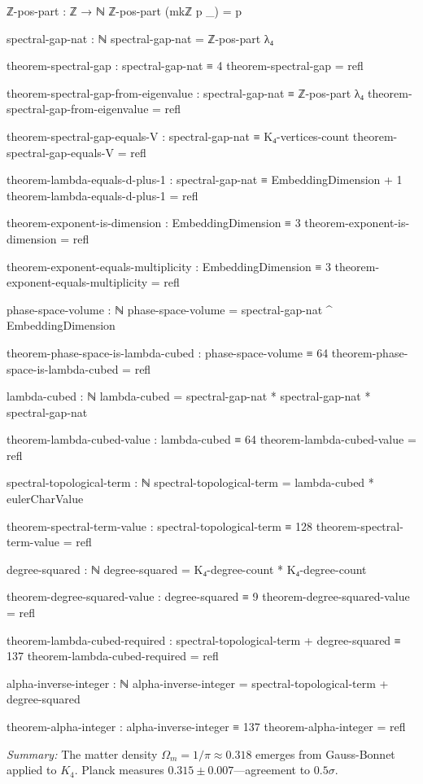 \documentclass[11pt,a4paper]{book}
\begin{document}
\begin{code}
ℤ-pos-part : ℤ → ℕ
ℤ-pos-part (mkℤ p _) = p

spectral-gap-nat : ℕ
spectral-gap-nat = ℤ-pos-part λ₄

theorem-spectral-gap : spectral-gap-nat ≡ 4
theorem-spectral-gap = refl

theorem-spectral-gap-from-eigenvalue : spectral-gap-nat ≡ ℤ-pos-part λ₄
theorem-spectral-gap-from-eigenvalue = refl

theorem-spectral-gap-equals-V : spectral-gap-nat ≡ K₄-vertices-count
theorem-spectral-gap-equals-V = refl

theorem-lambda-equals-d-plus-1 : spectral-gap-nat ≡ EmbeddingDimension + 1
theorem-lambda-equals-d-plus-1 = refl

theorem-exponent-is-dimension : EmbeddingDimension ≡ 3
theorem-exponent-is-dimension = refl

theorem-exponent-equals-multiplicity : EmbeddingDimension ≡ 3
theorem-exponent-equals-multiplicity = refl

phase-space-volume : ℕ
phase-space-volume = spectral-gap-nat ^ EmbeddingDimension

theorem-phase-space-is-lambda-cubed : phase-space-volume ≡ 64
theorem-phase-space-is-lambda-cubed = refl

lambda-cubed : ℕ
lambda-cubed = spectral-gap-nat * spectral-gap-nat * spectral-gap-nat

theorem-lambda-cubed-value : lambda-cubed ≡ 64
theorem-lambda-cubed-value = refl

spectral-topological-term : ℕ
spectral-topological-term = lambda-cubed * eulerCharValue

theorem-spectral-term-value : spectral-topological-term ≡ 128
theorem-spectral-term-value = refl

degree-squared : ℕ
degree-squared = K₄-degree-count * K₄-degree-count

theorem-degree-squared-value : degree-squared ≡ 9
theorem-degree-squared-value = refl

theorem-lambda-cubed-required : spectral-topological-term + degree-squared ≡ 137
theorem-lambda-cubed-required = refl

alpha-inverse-integer : ℕ
alpha-inverse-integer = spectral-topological-term + degree-squared

theorem-alpha-integer : alpha-inverse-integer ≡ 137
theorem-alpha-integer = refl
\end{code}

\medskip
\noindent\textit{Summary:} The matter density $\Omega_m = 1/\pi \approx 0.318$ emerges 
from Gauss-Bonnet applied to $K_4$. Planck measures $0.315 \pm 0.007$—agreement to $0.5\sigma$.
\end{document}
